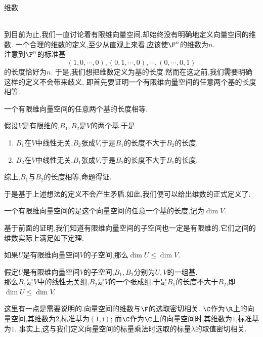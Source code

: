 \documentclass{ctexart}
\begin{document}
\pagestyle{empty}
\begin{center}\large 维数\end{center}
\\
到目前为止,我们一直讨论着有限维向量空间,却始终没有明确地定义向量空间的维数.
一个合理的维数的定义,至少从直观上来看,应该使$\F^n$的维数为$n$.\\
注意到$\F^n$的标准基$$(1,0,\cdots,0),(0,1,\cdots,0),\cdots,(0,\cdots,0,1)$$的长度恰好为$n$.
于是,我们想把维数定义为基的长度.然而在这之前,我们需要明确这样的定义不会带来歧义,
即首先要证明一个有限维向量空间的任意两个基的长度相等.
\begin{formal}[1.1 基的长度不依赖于基的选取]
    一个有限维向量空间的任意两个基的长度相等.
\end{formal}
\begin{solution}[Proof.]
    假设$V$是有限维的,$B_1,B_2$是$V$的两个基.于是
    \begin{enumerate}[label=\tbf{(\alph*)}]
        \item $B_1$在$V$中线性无关,$B_2$张成$V$,于是$B_1$的长度不大于$B_2$的长度.
        \item $B_2$在$V$中线性无关,$B_1$张成$V$,于是$B_2$的长度不大于$B_1$的长度.
    \end{enumerate}
    综上,$B_1$与$B_2$的长度相等,命题得证.
\end{solution}\noindent
于是基于上述想法的定义不会产生矛盾.如此,我们便可以给出维数的正式定义了.
\begin{definition}[1.2 定义:维数,$\dim{V}$]
    一个有限维向量空间的是这个向量空间的任意一个基的长度,记为$\dim{V}$.
\end{definition}\noindent
基于前面的证明,我们知道有限维向量空间的子空间也一定是有限维的.它们之间的维数实际上满足如下定理.
\begin{formal}[1.3 子空间的维数]
    如果$U$是有限维向量空间$V$的子空间,那么$\dim{U}\leqslant\dim{V}$.
\end{formal}
\begin{solution}[Proof.]
    假定$U$是有限维向量空间$V$的子空间,$B_1,B_2$分别为$U,V$的一组基.\\
    那么$B_1$是$V$中的线性无关组,$B_2$是$V$的一个张成组.于是$B_1$的长度不大于$B_2$,即$\dim{U}\leqslant\dim{V}$.
\end{solution}\noindent
这里有一点是需要说明的.向量空间的维数与$\F$的选取密切相关.
$\C$作为$\R$上的向量空间,其维数为$2$,标准基为$(1,\text{i})$;
而$\C$作为$\C$上的向量空间时,其维数为$1$,标准基为$1$.
事实上,这与我们定义向量空间的标量乘法时选取的标量$\lambda$的取值密切相关.\\
\end{document}
